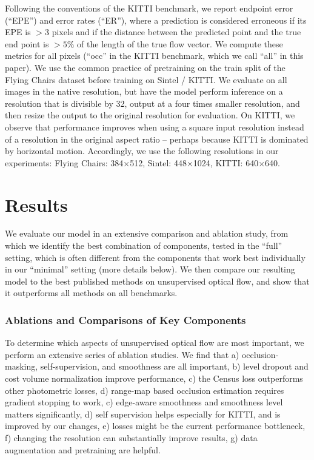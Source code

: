 \documentclass[runningheads]{llncs}
\begin{document}
Following the conventions of the KITTI benchmark, we report endpoint error (``EPE'') and error rates (``ER''), where a prediction is considered erroneous if its EPE is $>3$ pixels and if the distance between the predicted point and the true end point is $>5\%$ of the length of the true flow vector. We compute these metrics for all pixels (``occ'' in the KITTI benchmark, which we call ``all'' in this paper).
We use the common practice of pretraining on the train split of the Flying Chairs dataset before training on Sintel / KITTI. We evaluate on all images in the native resolution, but have the model perform inference on a resolution that is divisible by 32, output at a four times smaller resolution, and then resize the output to the original resolution for evaluation. On KITTI, we observe that performance improves when using a square input resolution instead of a resolution in the original aspect ratio -- perhaps because KITTI is dominated by horizontal motion. Accordingly, we use the following resolutions in our experiments: Flying Chairs: 384$\times$512, Sintel: 448$\times$1024, KITTI: 640$\times$640.

\section{Results}

We evaluate our model in an extensive comparison and ablation study, from which we identify the best combination of components, tested in the ``full'' setting, which is often different from the components that work best individually in our ``minimal'' setting (more details below). We then compare our resulting model to the best published methods on unsupervised optical flow, and show that it outperforms all methods on all benchmarks.

\subsubsection{Ablations and Comparisons of Key Components}
To determine which aspects of unsupervised optical flow are most important, we perform an extensive series of ablation studies.
We find that a) occlusion-masking, self-supervision, and smoothness are all important, b) level dropout and cost volume normalization improve performance, c) the Census loss outperforms other photometric losses, d) range-map based occlusion estimation requires gradient stopping to work, c) edge-aware smoothness and smoothness level matters significantly, d) self supervision helps especially for KITTI, and is improved by our changes, e) losses might be the current performance bottleneck, f) changing the resolution can substantially improve results, g) data augmentation and pretraining are helpful.
\end{document}
